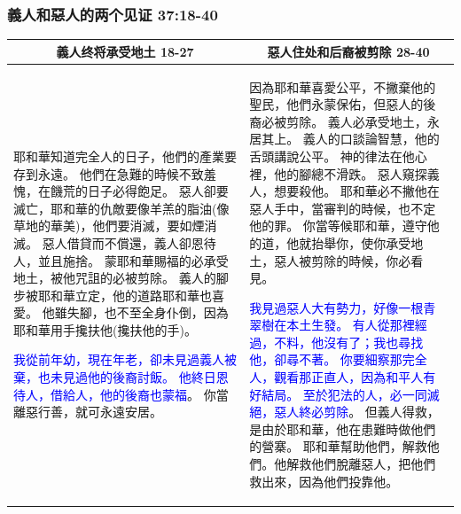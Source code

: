 \subsubsection{義人和惡人的两个见证 37:18-40}
\begin{table}[H]
\centering
\begin{tabular}{p{7.5cm}|p{9.5cm}}\hline\hline
\multicolumn{1}{c|}{義人终将承受地土 18-27}&\multicolumn{1}{c}{惡人住处和后裔被剪除 28-40}\\\hline
耶和華知道完全人的日子，他們的產業要存到永遠。
他們在急難的時候不致羞愧，在饑荒的日子必得飽足。
惡人卻要滅亡，耶和華的仇敵要像羊羔的脂油(像草地的華美)，他們要消滅，要如煙消滅。
惡人借貸而不償還，義人卻恩待人，並且施捨。
蒙耶和華賜福的必承受地土，被他咒詛的必被剪除。
義人的腳步被耶和華立定，他的道路耶和華也喜愛。
他雖失腳，也不至全身仆倒，因為耶和華用手攙扶他(攙扶他的手)。

\textcolor{blue}{我從前年幼，現在年老，卻未見過義人被棄，也未見過他的後裔討飯。
他終日恩待人，借給人，他的後裔也蒙福}。
你當離惡行善，就可永遠安居。
&因為耶和華喜愛公平，不撇棄他的聖民，他們永蒙保佑，但惡人的後裔必被剪除。
義人必承受地土，永居其上。
義人的口談論智慧，他的舌頭講說公平。
神的律法在他心裡，他的腳總不滑跌。
惡人窺探義人，想要殺他。
耶和華必不撇他在惡人手中，當審判的時候，也不定他的罪。
你當等候耶和華，遵守他的道，他就抬舉你，使你承受地土，惡人被剪除的時候，你必看見。

\textcolor{blue}{我見過惡人大有勢力，好像一根青翠樹在本土生發。
有人從那裡經過，不料，他沒有了；我也尋找他，卻尋不著。
你要細察那完全人，觀看那正直人，因為和平人有好結局。
至於犯法的人，必一同滅絕，惡人終必剪除}。
但義人得救，是由於耶和華，他在患難時做他們的營寨。
耶和華幫助他們，解救他們。他解救他們脫離惡人，把他們救出來，因為他們投靠他。\\\hline
\end{tabular}
\end{table} 


